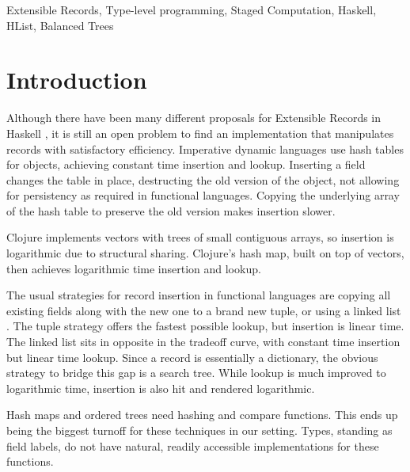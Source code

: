\documentclass[natbib]{sigplanconf}
\newcommand{\bruno}[1]{\textcolor{red}{\textbf{Bruno:}#1}}
\newcommand{\marcos}[1]{\textcolor{red}{\textbf{Marcos:}#1}}
\renewcommand{\bruno}[1]{}
\renewcommand{\marcos}[1]{}
\begin{document}
\keywords
 Extensible Records, Type-level programming, Staged Computation, Haskell, HList, Balanced Trees 

\section{Introduction} \label{sec:intro}

Although there have been many different proposals for Extensible Records in Haskell 
\cite{Gaster96apolymorphic, Jones99lightweightextensible, LabeledFunctions, Leijen:fclabels, Leijen:scopedlabels, Jel10},
it is still an open problem to find an implementation that manipulates records with satisfactory efficiency.
Imperative dynamic languages use hash tables for objects,
achieving constant time insertion and lookup.
Inserting a field changes the table in place,
destructing the old version of the object,
not allowing for persistency as required in functional languages.
Copying the underlying array of the hash table
to preserve the old version makes insertion slower.

Clojure \cite{Hickey:2008:CPL:1408681.1408682} implements vectors with trees of small contiguous arrays,
so insertion is logarithmic due to structural sharing. 
Clojure's hash map, built on top of vectors,
then achieves logarithmic time insertion and lookup.

The usual strategies for record insertion in functional languages are
copying all existing fields along with the new one to a brand new tuple,
or using a linked list \cite{Gaster96apolymorphic}.
The tuple strategy offers the fastest possible lookup, but insertion is linear time.
The linked list sits in opposite in the tradeoff curve,
with constant time insertion but linear time lookup.
Since a record is essentially a dictionary,
the obvious strategy to bridge this gap is a search tree.
While lookup is much improved to logarithmic time,
insertion is also hit and rendered logarithmic.

Hash maps and ordered trees need hashing and compare functions.
This ends up being the biggest turnoff for these techniques in our setting.
Types, standing as field labels, do not have natural, readily accessible implementations
for these functions.
\end{document}
